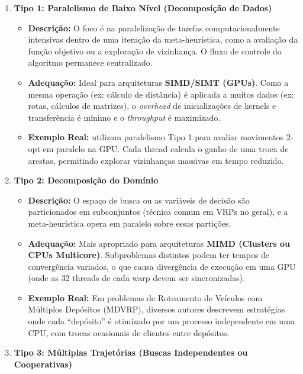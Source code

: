 \begin{enumerate}
  \def\labelenumi{\arabic{enumi}.}
  \tightlist
  \item
        \textbf{Tipo 1: Paralelismo de Baixo Nível (Decomposição de Dados)}

        \begin{itemize}
          \tightlist
          \item
                \textbf{Descrição:} O foco é na paralelização de tarefas
                computacionalmente intensivas dentro de uma iteração da
                meta-heurística, como a avaliação da função objetivo ou a exploração
                de vizinhança. O fluxo de controle do algoritmo permanece
                centralizado.
          \item
                \textbf{Adequação:} Ideal para arquiteturas \textbf{SIMD/SIMT
                  (GPUs)}. Como a mesma operação (ex: cálculo de distância) é aplicada
                a muitos dados (ex: rotas, cálculos de matrizes), o \emph{overhead}
                de inicializações de kernels e transferência é mínimo e o
                \emph{throughput} é maximizado.
          \item
                \textbf{Exemplo Real:} \textcite{tsp_gpu} utilizam paralelismo Tipo
                1 para avaliar movimentos \(2\)-opt em paralelo na GPU. Cada thread
                calcula o ganho de uma troca de arestas, permitindo explorar
                vizinhanças massivas em tempo reduzido.
        \end{itemize}
  \item
        \textbf{Tipo 2: Decomposição do Domínio}

        \begin{itemize}
          \tightlist
          \item
                \textbf{Descrição:} O espaço de busca ou as variáveis de decisão são
                particionados em subconjuntos (técnica comum em VRPs no geral), e a
                meta-heurística opera em paralelo sobre essas partições.
          \item
                \textbf{Adequação:} Mais apropriado para arquiteturas \textbf{MIMD
                  (Clusters ou CPUs Multicore)}. Subproblemas distintos podem ter
                tempos de convergência variados, o que causa divergência de execução
                em uma GPU (onde as 32 threads de cada warp devem ser
                sincronizadas).
          \item
                \textbf{Exemplo Real:} Em problemas de Roteamento de Veículos com
                Múltiplos Depósitos (MDVRP), diversos autores
                \autocite[@simchi2005logic]{crainic2010parallel} descrevem
                estratégias onde cada ``depósito'' é otimizado por um processo
                independente em uma CPU, com trocas ocasionais de clientes entre
                depósitos.
        \end{itemize}
  \item
        \textbf{Tipo 3: Múltiplas Trajetórias (Buscas Independentes ou
          Cooperativas)}


\end{enumerate}

